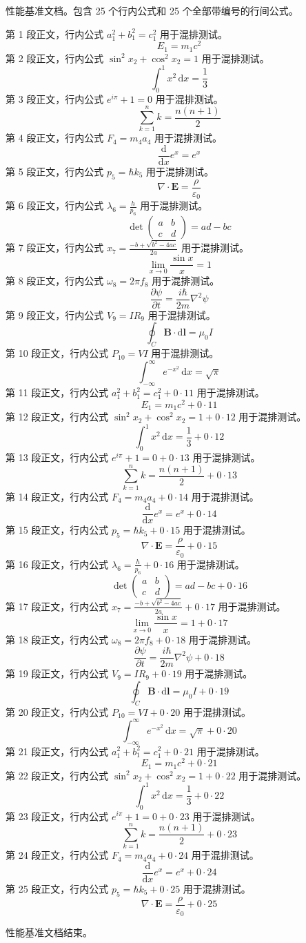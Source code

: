 性能基准文档。包含 25 个行内公式和 25 个全部带编号的行间公式。

第 1 段正文，行内公式 $a_1^2+b_1^2=c_1^2$ 用于混排测试。
$$E_1=m_1c^2$$
第 2 段正文，行内公式 $\sin^2 x_2+\cos^2 x_2=1$ 用于混排测试。
$$\int_0^1 x^2\,\mathrm{d}x=\frac13$$
第 3 段正文，行内公式 $e^{i\pi}+1=0$ 用于混排测试。
$$\sum_{k=1}^{n} k=\frac{n(n+1)}2$$
第 4 段正文，行内公式 $F_4=m_4a_4$ 用于混排测试。
$$\frac{\mathrm{d}}{\mathrm{d}x}e^x=e^x$$
第 5 段正文，行内公式 $p_5=\hbar k_5$ 用于混排测试。
$$\nabla\cdot\mathbf{E}=\frac{\rho}{\varepsilon_0}$$
第 6 段正文，行内公式 $\lambda_6=\frac{h}{p_6}$ 用于混排测试。
$$\det\begin{pmatrix}a&b\\c&d\end{pmatrix}=ad-bc$$
第 7 段正文，行内公式 $x_7=\frac{-b+\sqrt{b^2-4ac}}{2a}$ 用于混排测试。
$$\lim_{x\to0}\frac{\sin x}{x}=1$$
第 8 段正文，行内公式 $\omega_8=2\pi f_8$ 用于混排测试。
$$\frac{\partial \psi}{\partial t}=\frac{i\hbar}{2m}\nabla^2\psi$$
第 9 段正文，行内公式 $V_9=IR_9$ 用于混排测试。
$$\oint_C \mathbf{B}\cdot\mathrm{d}\mathbf{l}=\mu_0 I$$
第 10 段正文，行内公式 $P_{10}=VI$ 用于混排测试。
$$\int_{-\infty}^{\infty}e^{-x^2}\,\mathrm{d}x=\sqrt{\pi}$$
第 11 段正文，行内公式 $a_1^2+b_1^2=c_1^2+0\cdot11$ 用于混排测试。
$$E_1=m_1c^2+0\cdot11$$
第 12 段正文，行内公式 $\sin^2 x_2+\cos^2 x_2=1+0\cdot12$ 用于混排测试。
$$\int_0^1 x^2\,\mathrm{d}x=\frac13+0\cdot12$$
第 13 段正文，行内公式 $e^{i\pi}+1=0+0\cdot13$ 用于混排测试。
$$\sum_{k=1}^{n} k=\frac{n(n+1)}2+0\cdot13$$
第 14 段正文，行内公式 $F_4=m_4a_4+0\cdot14$ 用于混排测试。
$$\frac{\mathrm{d}}{\mathrm{d}x}e^x=e^x+0\cdot14$$
第 15 段正文，行内公式 $p_5=\hbar k_5+0\cdot15$ 用于混排测试。
$$\nabla\cdot\mathbf{E}=\frac{\rho}{\varepsilon_0}+0\cdot15$$
第 16 段正文，行内公式 $\lambda_6=\frac{h}{p_6}+0\cdot16$ 用于混排测试。
$$\det\begin{pmatrix}a&b\\c&d\end{pmatrix}=ad-bc+0\cdot16$$
第 17 段正文，行内公式 $x_7=\frac{-b+\sqrt{b^2-4ac}}{2a}+0\cdot17$ 用于混排测试。
$$\lim_{x\to0}\frac{\sin x}{x}=1+0\cdot17$$
第 18 段正文，行内公式 $\omega_8=2\pi f_8+0\cdot18$ 用于混排测试。
$$\frac{\partial \psi}{\partial t}=\frac{i\hbar}{2m}\nabla^2\psi+0\cdot18$$
第 19 段正文，行内公式 $V_9=IR_9+0\cdot19$ 用于混排测试。
$$\oint_C \mathbf{B}\cdot\mathrm{d}\mathbf{l}=\mu_0 I+0\cdot19$$
第 20 段正文，行内公式 $P_{10}=VI+0\cdot20$ 用于混排测试。
$$\int_{-\infty}^{\infty}e^{-x^2}\,\mathrm{d}x=\sqrt{\pi}+0\cdot20$$
第 21 段正文，行内公式 $a_1^2+b_1^2=c_1^2+0\cdot21$ 用于混排测试。
$$E_1=m_1c^2+0\cdot21$$
第 22 段正文，行内公式 $\sin^2 x_2+\cos^2 x_2=1+0\cdot22$ 用于混排测试。
$$\int_0^1 x^2\,\mathrm{d}x=\frac13+0\cdot22$$
第 23 段正文，行内公式 $e^{i\pi}+1=0+0\cdot23$ 用于混排测试。
$$\sum_{k=1}^{n} k=\frac{n(n+1)}2+0\cdot23$$
第 24 段正文，行内公式 $F_4=m_4a_4+0\cdot24$ 用于混排测试。
$$\frac{\mathrm{d}}{\mathrm{d}x}e^x=e^x+0\cdot24$$
第 25 段正文，行内公式 $p_5=\hbar k_5+0\cdot25$ 用于混排测试。
$$\nabla\cdot\mathbf{E}=\frac{\rho}{\varepsilon_0}+0\cdot25$$

性能基准文档结束。
